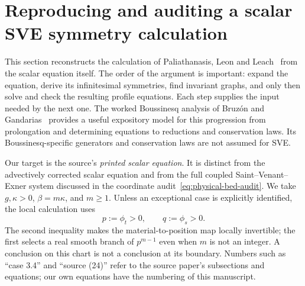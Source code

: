 \section{Reproducing and auditing a scalar SVE symmetry calculation}
\label{sec:sve-repro}
This section reconstructs the calculation of Paliathanasis, Leon and
Leach~\cite{ap} from the scalar equation itself. The order of the argument is
important: expand the equation, derive its infinitesimal symmetries, find
invariant graphs, and only then solve and check the resulting profile
equations. Each step supplies the input needed by the next one. The
worked Boussinesq analysis of Bruz\'{o}n and Gandarias~\cite[Sec.~2, pp.~157--159]{bruzon-gandarias-2021}
provides a useful expository model for this progression from prolongation
and determining equations to reductions and conservation laws. Its
Boussinesq-specific generators and conservation laws are not assumed for SVE.

Our target is the source's \emph{printed scalar equation}. It is distinct
from the advectively corrected scalar equation and from the full coupled
Saint--Venant--Exner system discussed in the coordinate audit~\eqref{eq:physical-bed-audit}.
We take $g,\kappa>0$, $\beta=m\kappa$, and $m\geq1$. Unless an exceptional
case is explicitly identified, the local calculation uses
\begin{equation}
 p:=\phi_t>0,\qquad q:=\phi_s>0.
 \label{eq:sve-repro-chart}
\end{equation}
The second inequality makes the material-to-position map locally invertible;
the first selects a real smooth branch of $p^{m-1}$ even when $m$ is not an
integer. A conclusion on this chart is not a conclusion at its boundary.
Numbers such as ``case 3.4'' and ``source (24)'' refer to the source paper's
subsections and equations; our own equations have the numbering of this manuscript.

